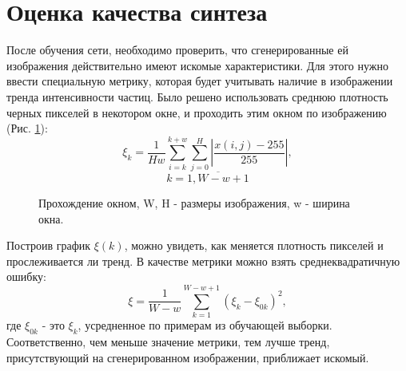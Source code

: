 \section{Оценка качества синтеза}
	После обучения сети, необходимо проверить, что сгенерированные ей изображения действительно имеют искомые характеристики. Для этого нужно ввести специальную метрику, которая будет учитывать наличие в изображении тренда интенсивности частиц. Было решено использовать среднюю плотность черных пикселей в некотором окне, и проходить этим окном по изображению (Рис. \ref{window}):
	\newpage
	$$\xi_k = \frac{1}{H w}{\sum_{i=k}^{k+w} \sum_{j=0}^{H}\left| \frac{x(i, j) - 255}{255} \right|}, $$$$k = \overline{1, W - w + 1} $$
	\begin{figure}
		\caption{Прохождение окном, W, H - размеры изображения, w - ширина окна.}
		\label{window}
	\end{figure}
	Построив график $\xi(k)$, можно увидеть, как меняется плотность пикселей и прослеживается ли тренд. В качестве метрики можно взять среднеквадратичную ошибку:
	$$ \xi = \frac{1}{W-w}\sum_{k=1}^{W-w+1} (\xi_k - \xi_{0k})^2,$$
	где $\xi_{0k}$ - это $\xi_k$, усредненное по примерам из обучающей выборки. Соответственно, чем меньше значение метрики, тем лучше тренд, присутствующий на сгенерированном изображении, приближает искомый.